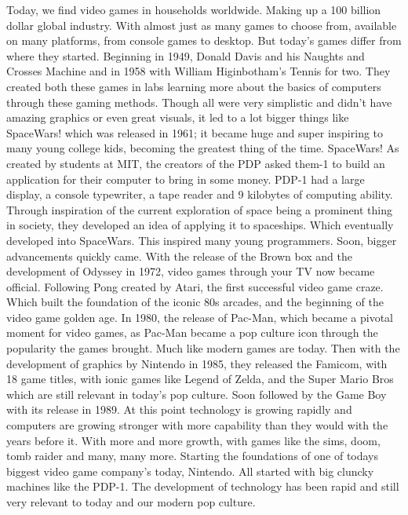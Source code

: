 \documentclass[letterpaper, 10 pt, conference]{IEEEconf}
\begin{document}
Today, we find video games in households worldwide. Making up a 100 billion dollar global industry. With almost just as many games to choose from, available on many platforms, from console games to desktop. But today's games differ from where they started. Beginning in 1949, Donald Davis and his Naughts and Crosses Machine and in 1958 with William Higinbotham’s Tennis for two. They created both these games in labs learning more about the basics of computers through these gaming methods. Though all were very simplistic and didn’t have amazing graphics or even great visuals, it led to a lot bigger things like SpaceWars! which was released in 1961; it became huge and super inspiring to many young college kids, becoming the greatest thing of the time. SpaceWars! As created by students at MIT, the creators of the PDP asked them-1 to build an application for their computer to bring in some money. PDP-1 had a large display, a console typewriter, a tape reader and 9 kilobytes of computing ability. Through inspiration of the current exploration of space being a prominent thing in society, they developed an idea of applying it to spaceships. Which eventually developed into SpaceWars. This inspired many young programmers. Soon, bigger advancements quickly came. With the release of the Brown box and the development of Odyssey in 1972, video games through your TV now became official. Following Pong created by Atari, the first successful video game craze. Which built the foundation of the iconic 80s arcades, and the beginning of the video game golden age. 
In 1980, the release of Pac-Man, which became a pivotal moment for video games, as Pac-Man became a pop culture icon through the popularity the games brought. Much like modern games are today. Then with the development of graphics by Nintendo in 1985, they released the Famicom, with 18 game titles, with ionic games like Legend of Zelda, and the Super Mario Bros which are still relevant in today's pop culture. Soon followed by the Game Boy with its release in 1989. At this point technology is growing rapidly and computers are growing stronger with more capability than they would with the years before it. With more and more growth, with games like the sims, doom, tomb raider and many, many more. Starting the foundations of one of todays biggest video game company's today, Nintendo. All started with big cluncky machines like the PDP-1. The development of technology has been rapid and still very relevant to today and our modern pop culture.  

\end{document}
